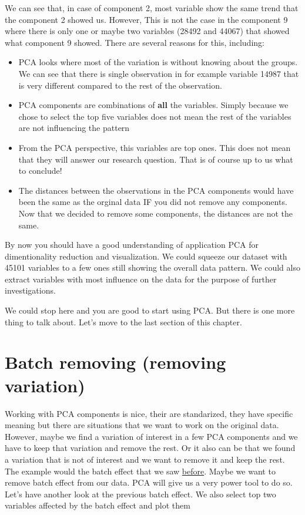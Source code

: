 \documentclass[
]{book}
\providecommand{\tightlist}{%
  \setlength{\itemsep}{0pt}\setlength{\parskip}{0pt}}
\theoremstyle{definition}
\theoremstyle{definition}
\theoremstyle{definition}
\theoremstyle{remark}
\begin{document}
We can see that, in case of component 2, most variable show the same trend that the component 2 showed us. However, This is not the case in the component 9 where there is only one or maybe two variables (28492 and 44067) that showed what component 9 showed. There are several reasons for this, including:

\begin{itemize}
\tightlist
\item
  PCA looks where most of the variation is without knowing about the groups. We can see that there is single observation in for example variable 14987 that is very different compared to the rest of the observation.
\item
  PCA components are combinations of \textbf{all} the variables. Simply because we chose to select the top five variables does not mean the rest of the variables are not influencing the pattern
\item
  From the PCA perspective, this variables are top ones. This does not mean that they will answer our research question. That is of course up to us what to conclude!
\item
  The distances between the observations in the PCA components would have been the same as the orginal data IF you did not remove any components. Now that we decided to remove some components, the distances are not the same.
\end{itemize}

By now you should have a good understanding of application PCA for dimentionality reduction and visualization. We could squeeze our dataset with 45101 variables to a few ones still showing the overall data pattern. We could also extract variables with most influence on the data for the purpose of further investigations.

We could stop here and you are good to start using PCA. But there is one more thing to talk about. Let's move to the last section of this chapter.

\hypertarget{pcabtrm}{%
\section{Batch removing (removing variation)}\label{pcabtrm}}

Working with PCA components is nice, their are standarized, they have specific meaning but there are situations that we want to work on the original data. However, maybe we find a variation of interest in a few PCA components and we have to keep that variation and remove the rest. Or it also can be that we found a variation that is not of interest and we want to remove it and keep the rest. The example would the batch effect that we saw \protect\hyperlink{pcaexample1}{before}. Maybe we want to remove batch effect from our data. PCA will give us a very power tool to do so. Let's have another look at the previous batch effect. We also select top two variables affected by the batch effect and plot them
\end{document}
